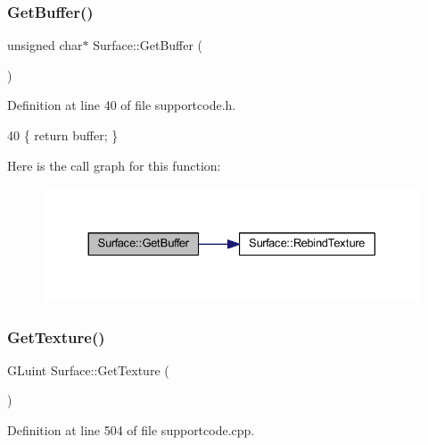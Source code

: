 \subsubsection{\texorpdfstring{Get\+Buffer()}{GetBuffer()}}
{\footnotesize\ttfamily unsigned char$\ast$ Surface\+::\+Get\+Buffer (\begin{DoxyParamCaption}{ }\end{DoxyParamCaption})\hspace{0.3cm}{\ttfamily [inline]}}



Definition at line 40 of file supportcode.\+h.


\begin{DoxyCode}
40 \{ \textcolor{keywordflow}{return} buffer; \}
\end{DoxyCode}
Here is the call graph for this function\+:\nopagebreak
\begin{figure}[H]
\begin{center}
\leavevmode
\includegraphics[width=330pt]{class_surface_a8f8da8f3ee82b8e657916f40b3f40eff_cgraph}
\end{center}
\end{figure}
\mbox{\label{class_surface_a2cd8789d26457187b8af4be8c178e9d4}} 
\subsubsection{\texorpdfstring{Get\+Texture()}{GetTexture()}}
{\footnotesize\ttfamily G\+Luint Surface\+::\+Get\+Texture (\begin{DoxyParamCaption}{ }\end{DoxyParamCaption})}



Definition at line 504 of file supportcode.\+cpp.


